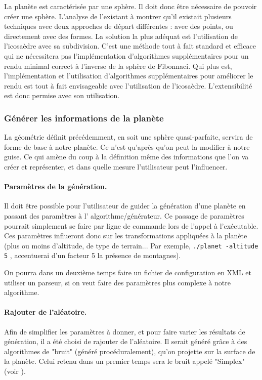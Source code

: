 \documentclass[a4paper]{article}
\begin{document}
    La planète est caractérisée par une sphère. Il doit donc être nécessaire de pouvoir créer une sphère. L'analyse de l'existant à montrer qu'il existait plusieurs techniques avec deux approches de départ différentes : avec des points, ou directement avec des formes.  La solution la plus adéquat est l'utilisation de l'icosaèdre avec sa subdivision. C'est une méthode tout à fait standard et efficace qui ne nécessitera pas l'implémentation d'algorithmes supplémentaires pour un rendu minimal correct à l'inverse de la sphère de Fibonnaci. Qui plus est, l'implémentation et l'utilisation d'algorithmes supplémentaires pour améliorer le rendu est tout à fait envisageable avec l'utilisation de l'icosaèdre. L'extensibilité  est donc permise avec son utilisation.
                
    \subsubsection{Générer les informations de la planète}
    
            La géométrie définit précédemment, en soit une sphère quasi-parfaite, servira de forme de base à notre planète. Ce n'est qu'après qu'on peut la modifier à notre guise. Ce qui amène du coup à la définition même des informations que l'on va créer et représenter, et dans quelle mesure l'utilisateur peut l'influencer.
    
            \paragraph{Paramètres de la génération.}
            Il doit être possible pour l'utilisateur de guider la génération d'une planète en passant des paramètres à l' algorithme/générateur. Ce passage de paramètres pourrait simplement se faire par ligne de commande lors de l'appel à l'exécutable. Ces paramètres influeront donc sur les transformations appliquées à la planète (plus ou moins d'altitude, de type de terrain... Par exemple, \verb|./planet -altitude 5| , accentuerai d'un facteur 5 la présence de montagnes).
            
            On pourra dans un deuxième temps faire un fichier de configuration en XML et utiliser un parseur, si on veut faire des paramètres plus complexe à notre algorithme.
    
            \paragraph{Rajouter de l'aléatoire.}
            Afin de simplifier les paramètres à donner, et pour faire varier les résultats de génération, il a été choisi de  rajouter de l'aléatoire. Il serait généré grâce à des algorithmes de "bruit" (généré procéduralement), qu'on projette sur la surface de la planète. Celui retenu dans un premier temps sera le bruit appelé "Simplex"(voir \cite{BookShader}).
            
\end{document}
